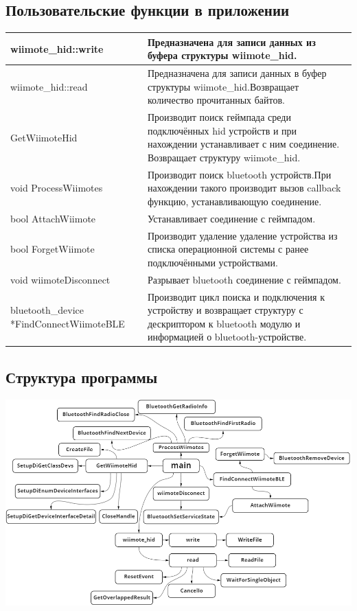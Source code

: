 \subsection{Пользовательские функции в приложении}
\begin{tabularx}{\linewidth}{|X|X|}
    \hline
    wiimote\_hid::write& Предназначена для записи данных из буфера структуры wiimote\_hid.\\\hline

    wiimote\_hid::read& Предназначена для записи данных в буфер структуры wiimote\_hid.Возвращает количество прочитанных байтов.\\\hline

    GetWiimoteHid& Производит поиск геймпада среди подключённых hid устройств и при нахождении устанавливает с ним соединение.
    Возвращает структуру wiimote\_hid.\\\hline

    void ProcessWiimotes& Производит поиск bluetooth устройств.При нахождении такого производит вызов callback функцию, устанавливающую соединение.\\\hline

    bool AttachWiimote& Устанавливает соединение с геймпадом.\\\hline

    bool ForgetWiimote& Производит удаление удаление устройства из списка операционной системы с ранее подключёнными устройствами.\\\hline

    void wiimoteDisconnect& Разрывает bluetooth соединение с геймпадом.\\\hline

    bluetooth\_device *FindConnectWiimoteBLE& Производит цикл поиска и подключения к устройству и возвращает структуру с дескриптором к bluetooth модулю и информацией о bluetooth-устройстве.\\\hline
\end{tabularx}

\subsection{Структура программы}
    \begin{center}
        \includegraphics[width=\textwidth]{content/program_structure}

    \end{center}

